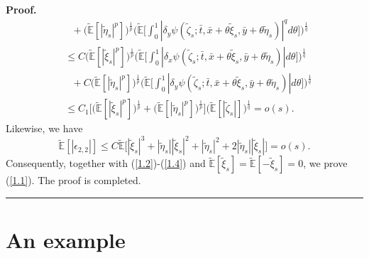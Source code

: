 \documentclass[a4paper,oneside,10pt]{article}%
\newenvironment{proof}[1][Proof]{\noindent \textbf{#1.} }{\  \rule{0.5em}{0.5em}}
\numberwithin{equation}{section}
\begin{document}
\begin{proof}
\begin{align*}
&  \text{ \  \ }+\big(\mathbb{\tilde{E}}[|\tilde{\eta}_{s}|^{p}]\big)^{\frac
{1}{p}}\bigg(\mathbb{\tilde{E}}\bigg[\int_{0}^{1}|\delta_{y}\psi(\tilde{\zeta}
_{s};\bar{t},\bar{x}+\theta \tilde{\xi}_{s},\bar{y}+\theta \tilde{\eta}
_{s})|^{q}d\theta \bigg]\bigg)^{\frac{1}{q}}\\
&  \leq C\big(\mathbb{\tilde{E}}[|\tilde{\xi}_{s}|^{p}]\big)^{\frac{1}{p}}
\bigg(\mathbb{\tilde{E}}\bigg[\int_{0}^{1}|\delta_{x}\psi(\tilde{\zeta}_{s};
\bar{t},\bar{x}+\theta \tilde{\xi}_{s},\bar{y}+\theta \tilde{\eta} _{s}%
)|d\theta \bigg]\bigg)^{\frac{1}{q}}\\
&  \text{ \  \ }+C\big(\mathbb{\tilde{E}}[|\tilde{\eta}_{s}|^{p}]\big)^{\frac{
1}{p}}\bigg(\mathbb{\tilde{E}}\bigg[\int_{0}^{1}|\delta_{y}\psi(\tilde{\zeta
}_{s};\bar{t},\bar{x}+\theta \tilde{\xi}_{s},\bar{y}+\theta \tilde{\eta}
_{s})|d\theta \bigg]\bigg)^{\frac{1}{q}}\\
&  \leq C_{1}\Big[ \big(\mathbb{\tilde{E}}[|\tilde{\xi}_{s}|^{p} ]\big)^{
\frac{1}{p}}+\big(\mathbb{\tilde{E}}[|\tilde{\eta}_{s}|^{p} ]\big)^{\frac{1}{
p}}\Big] \big(\mathbb{\tilde{E}}[|\tilde{\zeta}_{s}|]\big)^{\frac{1}{q}}
=o(s).
\end{align*}
Likewise, we have
\[
\mathbb{\tilde{E}}[|\epsilon_{2,2}|]\leq C\mathbb{\tilde{E}}\big[|\tilde{\xi}
_{s}|^{3}+|\tilde{\eta}_{s}||\tilde{\xi}_{s}|^{2}+|\tilde{\eta}_{s}|^{2}+2|
\tilde{\eta}_{s}||\tilde{\xi}_{s}|\big]=o(s).
\]
Consequently, together with (\ref{1.2})-(\ref{1.4}) and $\mathbb{\tilde{E}%
}[\tilde{\xi}_{s}]=\mathbb{\tilde{E}}[-\tilde{\xi}_{s}]=0$, we prove
(\ref{1.1}). The proof is completed.
\end{proof}

\section{An example}

\label{Section_an example}
\end{document}
